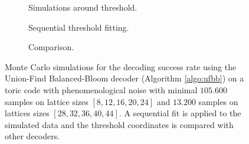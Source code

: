 \begin{figure}[htbp]
  \centering
  \begin{subfigure}[b]{0.49\textwidth}
    \begin{adjustbox}{Clip=0 1em 0 0}
      
    \end{adjustbox}
    \caption{Simulations around threshold.}
  \end{subfigure}
  \begin{subfigure}[b]{0.49\textwidth}
    \begin{adjustbox}{Clip=0 1em 0 0}
      
    \end{adjustbox}
    \caption{Sequential threshold fitting.}
  \end{subfigure}
  \begin{subfigure}[b]{\textwidth}
    \begin{adjustbox}{Clip=0 1em 0 0}
    
    \end{adjustbox}
    \caption{Comparison.}
  \end{subfigure}
  \caption{Monte Carlo simulations for the decoding success rate using the Union-Find Balanced-Bloom decoder (Algorithm \ref{algo:ufbb}) on a toric code with phenomenological noise with minimal $105.600$ samples on lattice sizes $[8,12,16,20,24]$ and $13.200$ samples on lattices sizes $[28, 32, 36, 40, 44]$. A sequential fit is applied to the simulated data and the threshold coordinates is compared with other decoders.}
  \label{fig:thres_ufbb_toric_3d}
\end{figure}

